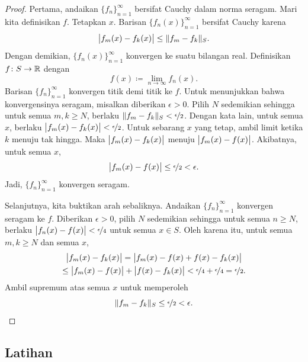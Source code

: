 \begin{proof}
Pertama, andaikan $\{ f_n \}_{n=1}^\infty$ bersifat Cauchy dalam norma seragam.
Mari kita definisikan $f$.  Tetapkan $x$.
Barisan $\bigl\{ f_n(x) \bigr\}_{n=1}^\infty$ bersifat Cauchy karena
\begin{equation*}
\bigl\lvert {f_m(x)-f_k(x)} \bigr\rvert
\leq
\lVert {f_m-f_k} \rVert_S .
\end{equation*}
Dengan demikian, $\bigl\{ f_n(x) \bigr\}_{n=1}^\infty$ konvergen ke suatu bilangan real.  Definisikan $f \colon S
\to {\mathbb{R}}$ dengan
\begin{equation*}
f(x) \coloneqq \lim_{n \to \infty} f_n(x) .
\end{equation*}
Barisan
$\{ f_n \}_{n=1}^\infty$ konvergen titik demi titik ke $f$.  Untuk menunjukkan bahwa konvergensinya
seragam, misalkan diberikan $\epsilon > 0$.  Pilih $N$ sedemikian sehingga
untuk semua $m, k \geq N$, berlaku
$\lVert {f_m-f_k} \rVert_S < \nicefrac{\epsilon}{2}$.  Dengan kata lain, untuk
semua $x$, berlaku
$\bigl\lvert {f_m(x)-f_k(x)} \bigr\rvert < \nicefrac{\epsilon}{2}$.  Untuk sebarang $x$ yang tetap, ambil limit
ketika $k$ menuju tak hingga.  Maka $\bigl\lvert {f_m(x)-f_k(x)} \bigr\rvert$
menuju $\bigl\lvert {f_m(x)-f(x)} \bigr\rvert$.
Akibatnya, untuk semua $x$,
\begin{equation*}
\bigl\lvert {f_m(x)-f(x)} \bigr\rvert \leq \nicefrac{\epsilon}{2} < \epsilon .
\end{equation*}
Jadi, $\{ f_n \}_{n=1}^\infty$ konvergen seragam.

Selanjutnya, kita buktikan arah sebaliknya.
Andaikan $\{ f_n \}_{n=1}^\infty$ konvergen seragam ke
$f$.  Diberikan $\epsilon > 0$, pilih $N$ sedemikian sehingga untuk semua $n \geq N$,
berlaku $\bigl\lvert {f_n(x)-f(x)} \bigr\rvert < \nicefrac{\epsilon}{4}$ untuk semua $x \in S$.
Oleh karena itu, untuk semua $m, k \geq N$ dan semua $x$,
\begin{multline*}
\bigl\lvert {f_m(x)-f_k(x)} \bigr\rvert = 
\bigl\lvert {f_m(x)-f(x)+f(x)-f_k(x)} \bigr\rvert
\\
\leq
\bigl\lvert {f_m(x)-f(x)} \bigr\rvert+\bigl\lvert {f(x)-f_k(x)} \bigr\rvert < \nicefrac{\epsilon}{4} +
\nicefrac{\epsilon}{4} = \nicefrac{\epsilon}{2} .
\end{multline*}
Ambil supremum atas semua $x$ untuk memperoleh
\begin{equation*}
\lVert {f_m-f_k} \rVert_S \leq \nicefrac{\epsilon}{2} < \epsilon .  \qedhere
\end{equation*}
\end{proof}

\subsection{Latihan}

